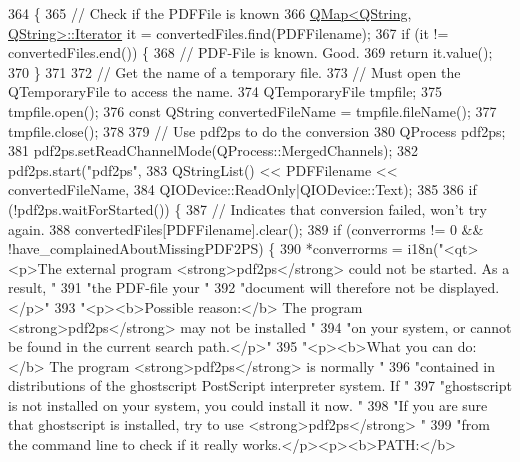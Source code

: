 \begin{DoxyCode}
364 \{
365   \textcolor{comment}{// Check if the PDFFile is known}
366   \hyperlink{classQMap}{QMap<QString, QString>::Iterator} it =  convertedFiles.find(PDFFilename);
367   \textcolor{keywordflow}{if} (it != convertedFiles.end()) \{
368     \textcolor{comment}{// PDF-File is known. Good.}
369     \textcolor{keywordflow}{return} it.value();
370   \}
371 
372   \textcolor{comment}{// Get the name of a temporary file.}
373   \textcolor{comment}{// Must open the QTemporaryFile to access the name.}
374   QTemporaryFile tmpfile;
375   tmpfile.open();
376   \textcolor{keyword}{const} QString convertedFileName = tmpfile.fileName();
377   tmpfile.close();
378 
379   \textcolor{comment}{// Use pdf2ps to do the conversion}
380   QProcess pdf2ps;
381   pdf2ps.setReadChannelMode(QProcess::MergedChannels);
382   pdf2ps.start(\textcolor{stringliteral}{"pdf2ps"},
383                QStringList() << PDFFilename << convertedFileName,
384                QIODevice::ReadOnly|QIODevice::Text);
385 
386   \textcolor{keywordflow}{if} (!pdf2ps.waitForStarted()) \{
387     \textcolor{comment}{// Indicates that conversion failed, won't try again.}
388     convertedFiles[PDFFilename].clear();
389     \textcolor{keywordflow}{if} (converrorms != 0 && !have\_complainedAboutMissingPDF2PS) \{
390       *converrorms = i18n(\textcolor{stringliteral}{"<qt><p>The external program <strong>pdf2ps</strong> could not be started. As a
       result, "}
391                           \textcolor{stringliteral}{"the PDF-file %
       your "}
392                           \textcolor{stringliteral}{"document will therefore not be displayed.</p>"}
393                           \textcolor{stringliteral}{"<p><b>Possible reason:</b> The program <strong>pdf2ps</strong> may not be
       installed "}
394                           \textcolor{stringliteral}{"on your system, or cannot be found in the current search path.</p>"}
395                           \textcolor{stringliteral}{"<p><b>What you can do:</b> The program <strong>pdf2ps</strong> is normally "}
396                           \textcolor{stringliteral}{"contained in distributions of the ghostscript PostScript interpreter system. If 
      "}
397                           \textcolor{stringliteral}{"ghostscript is not installed on your system, you could install it now. "}
398                           \textcolor{stringliteral}{"If you are sure that ghostscript is installed, try to use
       <strong>pdf2ps</strong> "}
399                           \textcolor{stringliteral}{"from the command line to check if it really works.</p><p><b>PATH:</b>
}
\end{DoxyCode}
